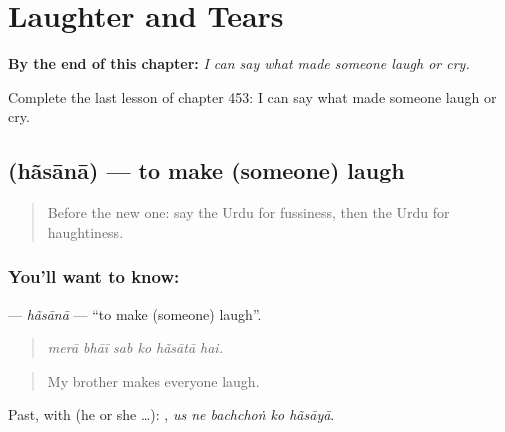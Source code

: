 
\chapter{Laughter and Tears}
\label{ch:ur-laughter-and-tears}

\begin{chapteropening}
\textbf{By the end of this chapter:} \emph{I can say what made someone laugh or cry.}

Complete the last lesson of chapter 453: I can say what made someone laugh or cry.
\end{chapteropening}

\section[\texorpdfstring{\ur{ہنسانا} (hãsānā)}{ہنسانا (hãsānā)}]{ (hãsānā) — to make (someone) laugh}

\label{lesson:UR-C453-hasana}



\begin{quote}
Before the new one: say the Urdu for fussiness, then the Urdu for haughtiness.
\end{quote}

\subsection*{You'll want to know: }
\textbf{} — \emph{hãsānā} — \textquotedblleft{}to make (someone) laugh\textquotedblright{}.

\begin{quote}
     
\end{quote}

\begin{quote}
\emph{merā bhāī sab ko hãsātā hai.}
\end{quote}

\begin{quote}
My brother makes everyone laugh.
\end{quote}

Past, with  (he or she …):     , \emph{us ne bachchoṅ ko hãsāyā}.

